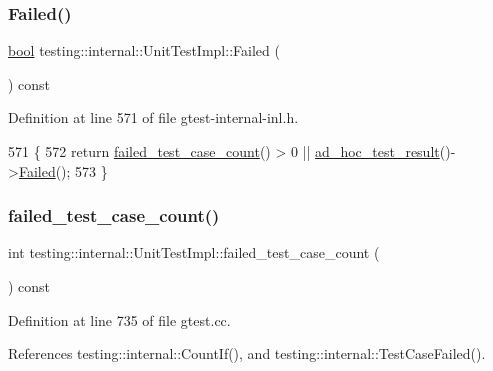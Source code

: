 \subsubsection{\texorpdfstring{Failed()}{Failed()}}
{\footnotesize\ttfamily \hyperlink{classbool}{bool} testing\+::internal\+::\+Unit\+Test\+Impl\+::\+Failed (\begin{DoxyParamCaption}{ }\end{DoxyParamCaption}) const\hspace{0.3cm}{\ttfamily [inline]}}



Definition at line 571 of file gtest-\/internal-\/inl.\+h.


\begin{DoxyCode}
571                       \{
572     \textcolor{keywordflow}{return} \hyperlink{classtesting_1_1internal_1_1UnitTestImpl_af981a537231e1dad4c1f092c6fdec1ff}{failed\_test\_case\_count}() > 0 || 
      \hyperlink{classtesting_1_1internal_1_1UnitTestImpl_a8be26dc90e0fac8f8be3552ffd98c69c}{ad\_hoc\_test\_result}()->\hyperlink{classtesting_1_1TestResult_afacc37e8b43c8574e4101bc61723c769}{Failed}();
573   \}
\end{DoxyCode}
\mbox{\label{classtesting_1_1internal_1_1UnitTestImpl_af981a537231e1dad4c1f092c6fdec1ff}} 
\subsubsection{\texorpdfstring{failed\+\_\+test\+\_\+case\+\_\+count()}{failed\_test\_case\_count()}}
{\footnotesize\ttfamily int testing\+::internal\+::\+Unit\+Test\+Impl\+::failed\+\_\+test\+\_\+case\+\_\+count (\begin{DoxyParamCaption}{ }\end{DoxyParamCaption}) const}



Definition at line 735 of file gtest.\+cc.



References testing\+::internal\+::\+Count\+If(), and testing\+::internal\+::\+Test\+Case\+Failed().


